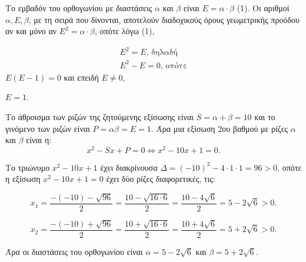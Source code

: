 
\begin{alist}
\item Το εμβαδόν του ορθογωνίου με διαστάσεις $\alpha$ και $\beta$ είναι $E = \alpha \cdot \beta$ (1).
Οι αριθμοί $\alpha, E, \beta$, με τη σειρά που δίνονται, αποτελούν διαδοχικούς όρους γεωμετρικής προόδου αν και μόνο αν $E^2 = \alpha \cdot \beta$, οπότε λόγω (1),

\begin{gather*}
E^2 = E\text{, δηλαδή} \\
E^2 - E = 0\text{, οπότε}
\end{gather*}
$E(E - 1) = 0$ και επειδή $E \ne 0$,

$E = 1$.

\item 
\begin{rlist}
\item Το άθροισμα των ριζών της ζητούμενης εξίσωσης είναι $S = \alpha + \beta = 10$ και το γινόμενο
των ριζών είναι $P = \alpha\beta = E = 1$. Άρα μια εξίσωση $2$ου βαθμού με ρίζες $\alpha$ και $\beta$ είναι η:
\[x^2 - Sx + P = 0 \Leftrightarrow x^2 - 10x + 1 = 0.\]

\item Το τριώνυμο $x^2 - 10x + 1$ έχει διακρίνουσα $\Delta = (-10)^2 - 4 \cdot 1 \cdot 1 = 96 > 0$, οπότε η
εξίσωση $x^2 - 10x + 1 = 0$ έχει δύο ρίζες διαφορετικές, τις:

\[x_1 = \dfrac{-(-10) - \sqrt{96}}{2} = \dfrac{10 - \sqrt{16 \cdot 6}}{2} = \dfrac{10 - 4\sqrt{6}}{2} = 5 - 2\sqrt{6} > 0.\]

\[x_2 = \dfrac{-(-10) + \sqrt{96}}{2} = \dfrac{10 + \sqrt{16 \cdot 6}}{2} = \dfrac{10 + 4\sqrt{6}}{2} = 5 + 2\sqrt{6} > 0.\]

Άρα οι διαστάσεις του ορθογωνίου είναι $\alpha = 5 - 2\sqrt{6}$ και $\beta = 5 + 2\sqrt{6}$.
\end{rlist}
\end{alist}

